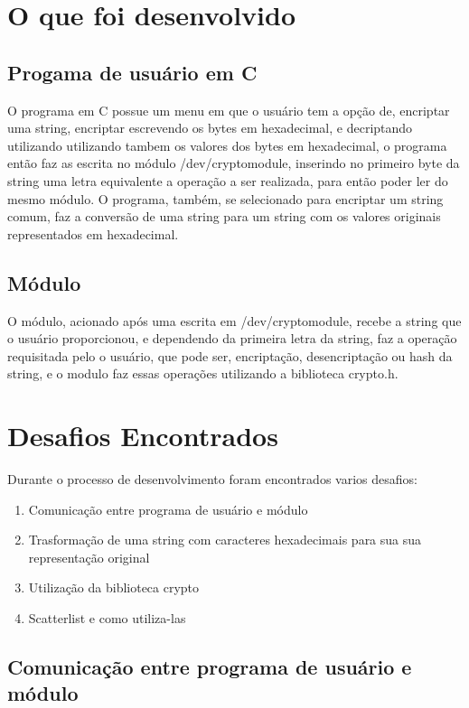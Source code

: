 \section{O que foi desenvolvido}

\subsection{Progama de usuário em C}

O programa em C possue um menu em que o usuário tem a opção de, encriptar uma string, encriptar escrevendo os bytes em hexadecimal, e decriptando utilizando utilizando tambem os valores dos bytes em hexadecimal, o programa então faz as escrita no módulo /dev/cryptomodule, inserindo no primeiro byte da string uma letra equivalente a operação a ser realizada, para então poder ler do mesmo módulo. O programa, também, se selecionado para encriptar um string comum, faz a conversão de uma string para um string com os valores originais representados em hexadecimal.

\subsection{Módulo}

O módulo, acionado após uma escrita em /dev/cryptomodule, recebe a string que o usuário proporcionou, e dependendo da primeira letra da string, faz a operação requisitada pelo o usuário, que pode ser, encriptação, desencriptação ou hash da string, e o modulo faz essas operações utilizando a biblioteca crypto.h.

\vfill

\section{Desafios Encontrados}

Durante o processo de desenvolvimento foram encontrados varios desafios:

\begin{enumerate}
\item Comunicação entre programa de usuário e módulo
\item Trasformação de uma string com caracteres hexadecimais para sua sua representação original
\item Utilização da biblioteca crypto
\item Scatterlist e como utiliza-las
\end{enumerate}

\subsection{Comunicação entre programa de usuário e módulo}

